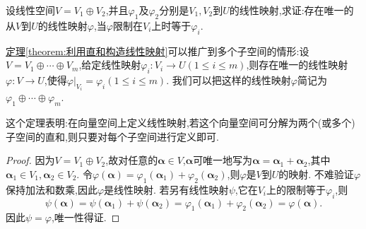 \documentclass[../../main.tex]{subfiles}%
\begin{document}
\begin{theorem}\label{theorem:利用直和构造线性映射}
设线性空间\(V = V_1\oplus V_2\),并且\(\varphi_1\)及\(\varphi_2\)分别是\(V_1,V_2\)到\(U\)的线性映射,求证:存在唯一的从\(V\)到\(U\)的线性映射\(\varphi\),当\(\varphi\)限制在\(V_i\)上时等于\(\varphi_i\).
\end{theorem}
\begin{remark}
\hyperref[theorem:利用直和构造线性映射]{定理\ref{theorem:利用直和构造线性映射}}可以推广到多个子空间的情形:设\(V = V_1\oplus\cdots\oplus V_m\),给定线性映射\(\varphi_i:V_i\to U(1\leqslant  i\leqslant  m)\),则存在唯一的线性映射\(\varphi:V\to U\),使得\(\left.\varphi\right|_{V_i}=\varphi_i(1\leqslant  i\leqslant  m)\). 我们可以把这样的线性映射\(\varphi\)简记为\(\varphi_1\oplus\cdots\oplus\varphi_m\).
\end{remark}
\begin{note}
这个定理表明:在向量空间上定义线性映射,若这个向量空间可分解为两个(或多个)子空间的直和,则只要对每个子空间进行定义即可.
\end{note}
\begin{proof}

因为\(V = V_1\oplus V_2\),故对任意的\(\boldsymbol{\alpha}\in V\),\(\boldsymbol{\alpha}\)可唯一地写为\(\boldsymbol{\alpha}=\boldsymbol{\alpha}_1+\boldsymbol{\alpha}_2\),其中\(\boldsymbol{\alpha}_1\in V_1,\boldsymbol{\alpha}_2\in V_2\). 令\(\varphi(\boldsymbol{\alpha})=\varphi_1(\boldsymbol{\alpha}_1)+\varphi_2(\boldsymbol{\alpha}_2)\),则\(\varphi\)是\(V\)到\(U\)的映射. 不难验证\(\varphi\)保持加法和数乘,因此\(\varphi\)是线性映射. 若另有线性映射\(\psi\),它在\(V_i\)上的限制等于\(\varphi_i\),则
\[
\psi(\boldsymbol{\alpha})=\psi(\boldsymbol{\alpha}_1)+\psi(\boldsymbol{\alpha}_2)=\varphi_1(\boldsymbol{\alpha}_1)+\varphi_2(\boldsymbol{\alpha}_2)=\varphi(\boldsymbol{\alpha}).
\]
因此\(\psi = \varphi\),唯一性得证.

\end{proof}
\end{document}
